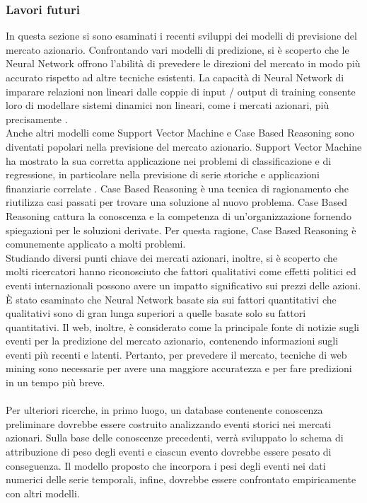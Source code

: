 \documentclass[a4paper,12pt]{report}
\begin{document}
\subsubsection{Lavori futuri}
In questa sezione si sono esaminati i recenti sviluppi dei modelli di previsione del mercato azionario. Confrontando vari modelli di predizione, si è scoperto che le Neural Network offrono l'abilità di prevedere le direzioni del mercato in modo più accurato rispetto ad altre tecniche esistenti. La capacità di Neural Network di imparare relazioni non lineari dalle coppie di input / output di training consente loro di modellare sistemi dinamici non lineari, come i mercati azionari, più precisamente \cite{23}.\\Anche altri modelli come Support Vector Machine e Case Based Reasoning sono diventati popolari nella previsione del mercato azionario. Support Vector Machine ha mostrato la sua corretta applicazione nei problemi di classificazione e di regressione, in particolare nella previsione di serie storiche e applicazioni finanziarie correlate \cite{46}. Case Based Reasoning è una tecnica di ragionamento che riutilizza casi passati per trovare una soluzione al nuovo problema. Case Based Reasoning cattura la conoscenza e la competenza di un'organizzazione fornendo spiegazioni per le soluzioni derivate. Per questa ragione, Case Based Reasoning è comunemente applicato a molti problemi.\\ Studiando diversi punti chiave dei mercati azionari, inoltre, si è scoperto che molti ricercatori hanno riconosciuto che fattori qualitativi come effetti politici ed eventi internazionali possono avere un impatto significativo sui prezzi delle azioni. È stato esaminato che Neural Network basate sia sui fattori quantitativi che qualitativi sono di gran lunga superiori a quelle basate solo su fattori quantitativi. Il web, inoltre, è considerato come la principale fonte di notizie sugli eventi per la predizione del mercato azionario, contenendo informazioni sugli eventi più recenti e latenti. Pertanto, per prevedere il mercato, tecniche di web mining sono necessarie per avere una maggiore accuratezza e per fare predizioni in un tempo più breve.\\~\\ Per ulteriori ricerche, in primo luogo, un database contenente conoscenza preliminare dovrebbe essere costruito analizzando eventi storici nei mercati azionari. Sulla base delle conoscenze precedenti, verrà sviluppato lo schema di attribuzione di peso degli eventi e ciascun evento dovrebbe essere pesato di conseguenza. Il modello proposto che incorpora i pesi degli eventi nei dati numerici delle serie temporali, infine, dovrebbe essere confrontato empiricamente con altri modelli.
\end{document}
